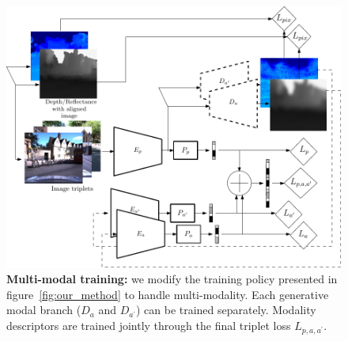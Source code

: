 \begin{figure}
	\centering
	
	\includegraphics[width=\linewidth]{reflectance/multimod_training}
	
	\caption[Multi-modal training pipeline]{\label{fig:multi_mod} \textbf{Multi-modal training:} we modify the training policy presented in figure~\ref{fig:our_method} to handle multi-modality. Each generative modal branch ($D_a$ and $D_{a^\prime}$) can be trained separately. Modality descriptors are trained jointly through the final triplet loss $L_{p, a, a^\prime}$.}
	
\end{figure}